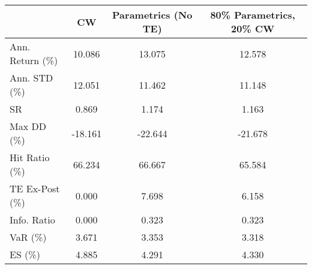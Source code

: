 \begin{tabular}{lccc}
\toprule
{} &      CW &  Parametrics (No TE) &  80\% Parametrics, 20\% CW \\
\midrule
Ann. Return (\%) &  10.086 &               13.075 &                   12.578 \\
Ann. STD (\%)    &  12.051 &               11.462 &                   11.148 \\
SR              &   0.869 &                1.174 &                    1.163 \\
Max DD (\%)      & -18.161 &              -22.644 &                  -21.678 \\
Hit Ratio (\%)   &  66.234 &               66.667 &                   65.584 \\
TE Ex-Post (\%)  &   0.000 &                7.698 &                    6.158 \\
Info. Ratio     &   0.000 &                0.323 &                    0.323 \\
VaR (\%)         &   3.671 &                3.353 &                    3.318 \\
ES (\%)          &   4.885 &                4.291 &                    4.330 \\
\bottomrule
\end{tabular}
